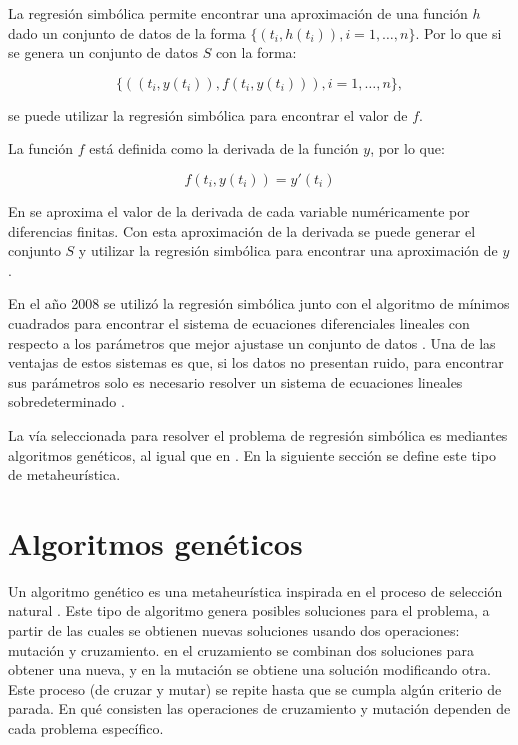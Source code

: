 La regresión simbólica permite encontrar una aproximación de una función $h$ dado un conjunto de datos de la forma $\{(t_i, h(t_i)), i = 1, \dots, n\}$. Por lo que si se genera un conjunto de datos $S$ con la forma:

$$\{((t_i, y(t_i)), f(t_i, y(t_i))), i = 1, \dots, n\},$$

se puede utilizar la regresión simbólica para encontrar el valor de $f$.

La función $f$ está definida como la derivada de la función $y$, por lo que:

$$f(t_i, y(t_i)) = y'(t_i)$$

En \cite{gaucel2014learning, iba2008inference,kronberger2019identification} se aproxima el valor de la derivada de cada variable numéricamente por diferencias finitas. Con esta aproximación de la derivada se puede generar el conjunto $S$ y utilizar la regresión simbólica para encontrar una aproximación de $y$.

En el año 2008 se utilizó la regresión simbólica junto con el algoritmo de mínimos cuadrados para encontrar el sistema de ecuaciones diferenciales lineales con respecto a los parámetros que mejor ajustase un conjunto de datos \cite{iba2008inference}. Una de las ventajas de estos sistemas es que, si los datos no presentan ruido, para encontrar sus parámetros solo es necesario resolver un sistema de ecuaciones lineales sobredeterminado \cite{myers2012generalized}.

La vía seleccionada para resolver el problema de regresión simbólica es mediantes algoritmos genéticos, al igual que en \cite{koza1994genetic, iba2008inference, gaucel2014learning, kronberger2019identification}. En la siguiente sección se define este tipo de metaheurística.

\section{Algoritmos genéticos}\label{section:genetic_algorithm}

Un algoritmo genético es una metaheurística inspirada en el proceso de selección natural \cite{mitchell1998introduction}. Este tipo de algoritmo genera posibles soluciones para el problema, a partir de las cuales se obtienen nuevas soluciones usando dos operaciones: mutación y cruzamiento. en el cruzamiento se combinan dos soluciones para obtener una nueva, y en la mutación se obtiene una solución modificando otra. Este proceso (de cruzar y mutar) se repite hasta que se cumpla algún criterio de parada. En qué consisten las operaciones de cruzamiento y mutación dependen de cada problema específico.

